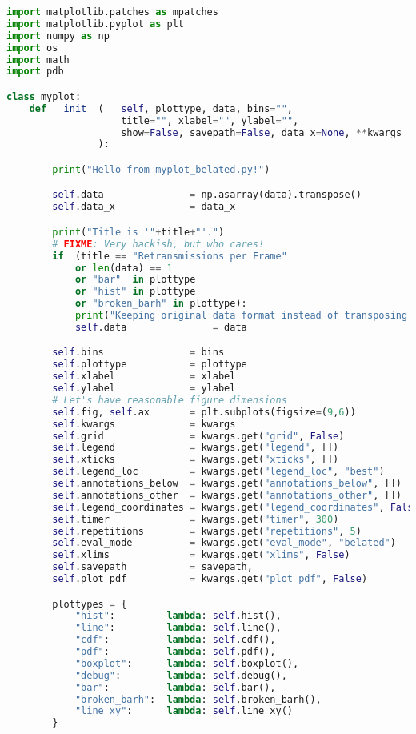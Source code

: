\begin{lstlisting}[language=Python,caption=myplot.py]
import matplotlib.patches as mpatches
import matplotlib.pyplot as plt
import numpy as np
import os
import math
import pdb

class myplot:
    def __init__(   self, plottype, data, bins="",
                    title="", xlabel="", ylabel="",
                    show=False, savepath=False, data_x=None, **kwargs
                ):

        print("Hello from myplot_belated.py!")

        self.data               = np.asarray(data).transpose()
        self.data_x             = data_x

        print("Title is '"+title+"'.")
        # FIXME: Very hackish, but who cares!
        if  (title == "Retransmissions per Frame"
            or len(data) == 1
            or "bar"  in plottype
            or "hist" in plottype
            or "broken_barh" in plottype):
            print("Keeping original data format instead of transposing.")
            self.data               = data

        self.bins               = bins
        self.plottype           = plottype
        self.xlabel             = xlabel
        self.ylabel             = ylabel
        # Let's have reasonable figure dimensions
        self.fig, self.ax       = plt.subplots(figsize=(9,6))
        self.kwargs             = kwargs
        self.grid               = kwargs.get("grid", False)
        self.legend             = kwargs.get("legend", [])
        self.xticks             = kwargs.get("xticks", [])
        self.legend_loc         = kwargs.get("legend_loc", "best")
        self.annotations_below  = kwargs.get("annotations_below", [])
        self.annotations_other  = kwargs.get("annotations_other", [])
        self.legend_coordinates = kwargs.get("legend_coordinates", False)
        self.timer              = kwargs.get("timer", 300)
        self.repetitions        = kwargs.get("repetitions", 5)
        self.eval_mode          = kwargs.get("eval_mode", "belated")
        self.xlims              = kwargs.get("xlims", False)
        self.savepath           = savepath,
        self.plot_pdf           = kwargs.get("plot_pdf", False)

        plottypes = {
            "hist":         lambda: self.hist(),
            "line":         lambda: self.line(),
            "cdf":          lambda: self.cdf(),
            "pdf":          lambda: self.pdf(),
            "boxplot":      lambda: self.boxplot(),
            "debug":        lambda: self.debug(),
            "bar":          lambda: self.bar(),
            "broken_barh":  lambda: self.broken_barh(),
            "line_xy":      lambda: self.line_xy()
        }


\end{lstlisting}
